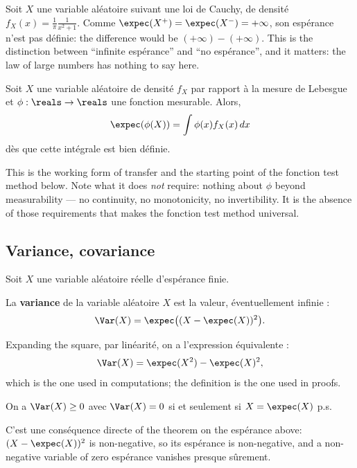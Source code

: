 \begin{example}
  Soit $X$ une variable aléatoire suivant une loi de Cauchy, de densité
  $f_{X}(x) = \frac{1}{\pi}\frac{1}{x^{2}+1}$. Comme
  $\expec(X^{+}) = \expec(X^{-}) = +\infty$, son espérance n'est pas définie: the
  difference would be $(+\infty)-(+\infty)$. This is the distinction between
  ``infinite espérance'' and ``no espérance'', and it matters: the law of large
  numbers has nothing to say here.
\end{example}

\begin{theorem}
  Soit $X$ une variable aléatoire de densité $f_{X}$ par rapport à la mesure de
  Lebesgue et $\phi : \reals \to \reals$ une fonction mesurable. Alors,
  \[
    \expec(\phi(X)) = \int \phi(x) f_{X}(x)\,dx
  \]
  dès que cette intégrale est bien définie.
\end{theorem}

This is the working form of transfer and the starting point of the fonction test
method below. Note what it does \emph{not} require: nothing about $\phi$ beyond
measurability --- no continuity, no monotonicity, no invertibility. It is the
absence of those requirements that makes the fonction test method universal.

\subsection{Variance, covariance}

Soit $X$ une variable aléatoire réelle d'espérance finie.

\begin{definition}[Variance]
  La \textbf{variance} de la variable aléatoire $X$ est la valeur, éventuellement
  infinie :
  \[
    \Var(X) = \expec\big((X-\expec(X))^{2}\big).
  \]
\end{definition}

Expanding the square, par linéarité, on a l'expression équivalente :
\[
  \Var(X) = \expec(X^{2}) - \expec(X)^{2},
\]
which is the one used in computations; the definition is the one used in proofs.

\begin{prop}
  On a $\Var(X) \geq 0$ avec $\Var(X) = 0$ si et seulement si $X = \expec(X)$ p.s.
\end{prop}

\begin{remark}
  C'est une conséquence directe of the theorem on the espérance above:
  $(X-\expec(X))^{2}$ is non-negative, so its espérance is non-negative, and a
  non-negative variable of zero espérance vanishes presque sûrement.
\end{remark}

